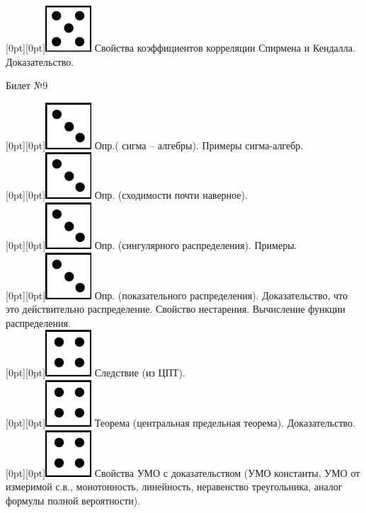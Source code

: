 \documentclass[10pt]{article}
\begin{document}
\raisebox{-1pt}[0pt][0pt]{\includegraphics[width=0.02\linewidth]{5.png}} Свойства коэффициентов корреляции Спирмена и Кендалла. Доказательство. \\ 

\begin{center} {\Large Билет №9} \end{center} 

\raisebox{-1pt}[0pt][0pt]{\includegraphics[width=0.02\linewidth]{3.png}} Опр.( сигма – алгебры). Примеры сигма-алгебр. \\

\raisebox{-1pt}[0pt][0pt]{\includegraphics[width=0.02\linewidth]{3.png}} Опр. (сходимости почти наверное). \\

\raisebox{-1pt}[0pt][0pt]{\includegraphics[width=0.02\linewidth]{3.png}} Опр. (сингулярного распределения). Примеры. \\

\raisebox{-1pt}[0pt][0pt]{\includegraphics[width=0.02\linewidth]{3.png}}  Опр. (показательного распределения). Доказательство, что это действительно распределение. Свойство нестарения. Вычисление функции распределения.  \\  

\raisebox{-1pt}[0pt][0pt]{\includegraphics[width=0.02\linewidth]{4.png}} Следствие (из ЦПТ). \\

\raisebox{-1pt}[0pt][0pt]{\includegraphics[width=0.02\linewidth]{4.png}} Теорема (центральная предельная теорема). Доказательство. \\        

\raisebox{-1pt}[0pt][0pt]{\includegraphics[width=0.02\linewidth]{4.png}} Свойства УМО с доказательством (УМО константы, УМО от измеримой с.в., монотонность,  линейность, неравенство треугольника,  аналог формулы полной вероятности). \\
\end{document}
